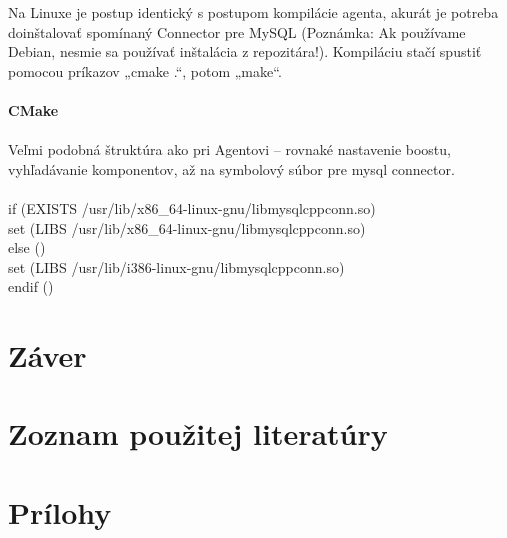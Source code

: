 \documentclass[a4paper,12pt]{article}
\begin{document}
Na Linuxe je postup identický s postupom kompilácie agenta, akurát je potreba doinštalovať spomínaný Connector pre MySQL (Poznámka: Ak používame Debian, nesmie sa používať inštalácia z repozitára!). Kompiláciu stačí spustiť pomocou príkazov „cmake .“, potom „make“. \\ \\
\textbf{CMake} \\ \\
Veľmi podobná štruktúra ako pri Agentovi – rovnaké nastavenie boostu, vyhľadávanie komponentov, až na symbolový súbor pre mysql connector.\\ \\
if (EXISTS /usr/lib/x86\_64-linux-gnu/libmysqlcppconn.so) \\
set (LIBS /usr/lib/x86\_64-linux-gnu/libmysqlcppconn.so) \\
else () \\
set (LIBS /usr/lib/i386-linux-gnu/libmysqlcppconn.so) \\
endif () \\




\section*{Záver}
\newpage

\section*{Zoznam použitej literatúry}

\newpage

\section*{Prílohy}

\newpage
\end{document}

